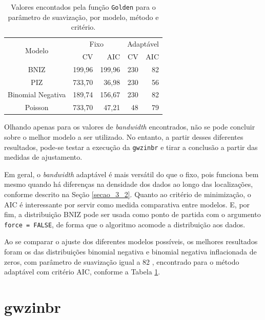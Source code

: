 \documentclass[12pt, a4paper, twoside]{report}
\numberwithin{equation}{section} %
\begin{document}
\begin{table}[htb]
\caption{Valores encontados pela função \texttt{Golden} para o parâmetro de suavização, por modelo, método e critério.}
\centering
\begin{tabular}{l|r|r|r|r|r}
\hline
\multicolumn{2}{c|}{\multirow{2}{*}{Modelo}} & \multicolumn{2}{c|}{Fixo} & \multicolumn{2}{c}{Adaptável} \\
\cline{3-6}
\multicolumn{2}{l|}{} & CV & AIC & CV & AIC\\
\hline
\multicolumn{2}{c|}{BNIZ} & 199,96 & 199,96  & 230 &  82    \\
\multicolumn{2}{c|}{PIZ} & 733,70 & 36,98  & 230 &  56    \\
\multicolumn{2}{c|}{Binomial Negativa} & 189,74 & 156,67 & 230 &  82  \\
\multicolumn{2}{c|}{Poisson} & 733,70 & 47,21 & 48 &  79   \\
            \hline
\end{tabular}
\label{resultados_golden}
\end{table}

Olhando apenas para os valores de \textit{bandwidth} encontrados, não se pode concluir sobre o melhor modelo a ser utilizado. No entanto, a partir desses diferentes resultados, pode-se testar a execução da \texttt{gwzinbr} e tirar a conclusão a partir das medidas de ajustamento.

Em geral, o \textit{bandwidth} adaptável é mais versátil do que o fixo, pois funciona bem mesmo quando há diferenças na densidade dos dados ao longo das localizações, conforme descrito na Seção \ref{secao_3_2}. Quanto ao critério de minimização, o AIC é interessante por servir como medida comparativa entre modelos. E, por fim, a distribuição BNIZ pode ser usada como ponto de partida com o argumento \texttt{force = FALSE}, de forma que o algoritmo acomode a distribuição aos dados.

Ao se comparar o ajuste dos diferentes modelos possíveis, os melhores resultados foram os das distribuições binomial negativa e binomial negativa inflacionada de zeros, com parâmetro de suavização igual a 82 \citep{dasilva2023}, encontrado para o método adaptável com critério AIC, conforme a Tabela \ref{resultados_golden}.

\section{gwzinbr}

\end{document}
